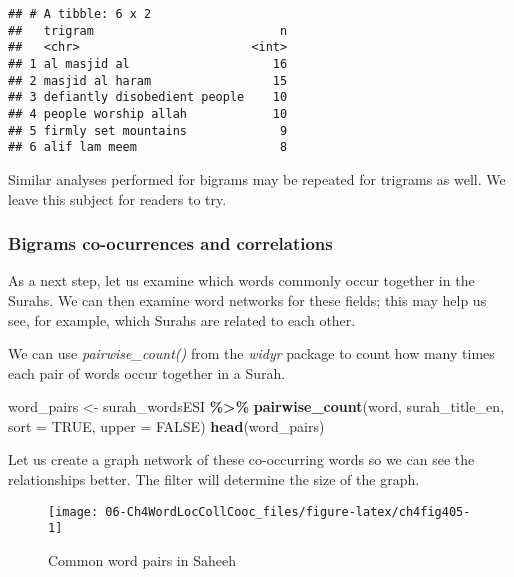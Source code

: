 \documentclass[
]{article}
\newenvironment{Shaded}{\begin{snugshade}}{\end{snugshade}}
\newcommand{\AttributeTok}[1]{\textcolor[rgb]{0.13,0.29,0.53}{#1}}
\newcommand{\ConstantTok}[1]{\textcolor[rgb]{0.56,0.35,0.01}{#1}}
\newcommand{\FunctionTok}[1]{\textcolor[rgb]{0.13,0.29,0.53}{\textbf{#1}}}
\newcommand{\NormalTok}[1]{#1}
\newcommand{\OtherTok}[1]{\textcolor[rgb]{0.56,0.35,0.01}{#1}}
\newcommand{\SpecialCharTok}[1]{\textcolor[rgb]{0.81,0.36,0.00}{\textbf{#1}}}
\begin{document}
\begin{verbatim}
## # A tibble: 6 x 2
##   trigram                          n
##   <chr>                        <int>
## 1 al masjid al                    16
## 2 masjid al haram                 15
## 3 defiantly disobedient people    10
## 4 people worship allah            10
## 5 firmly set mountains             9
## 6 alif lam meem                    8
\end{verbatim}

\normalsize

Similar analyses performed for bigrams may be repeated for trigrams as well. We leave this subject for readers to try.

\hypertarget{bigrams-co-ocurrences-and-correlations}{%
\subsubsection{Bigrams co-ocurrences and correlations}\label{bigrams-co-ocurrences-and-correlations}}

As a next step, let us examine which words commonly occur together in the Surahs. We can then examine word networks for these fields; this may help us see, for example, which Surahs are related to each other.

We can use \emph{pairwise\_count()} from the \emph{widyr} package to count how many times each pair of words occur together in a Surah.

\footnotesize

\begin{Shaded}
\begin{Highlighting}[]
\NormalTok{word\_pairs }\OtherTok{\textless{}{-}}\NormalTok{ surah\_wordsESI }\SpecialCharTok{\%\textgreater{}\%} 
  \FunctionTok{pairwise\_count}\NormalTok{(word, surah\_title\_en, }\AttributeTok{sort =} \ConstantTok{TRUE}\NormalTok{, }\AttributeTok{upper =} \ConstantTok{FALSE}\NormalTok{)}
\FunctionTok{head}\NormalTok{(word\_pairs)}
\end{Highlighting}
\end{Shaded}

\normalsize

Let us create a graph network of these co-occurring words so we can see the relationships better. The filter will determine the size of the graph.

\begin{figure}

{\centering \texttt{[image: 06-Ch4WordLocCollCooc\_files/figure-latex/ch4fig405-1]} 

}

\caption{Common word pairs in Saheeh}\label{fig:ch4fig405}
\end{figure}
\end{document}
